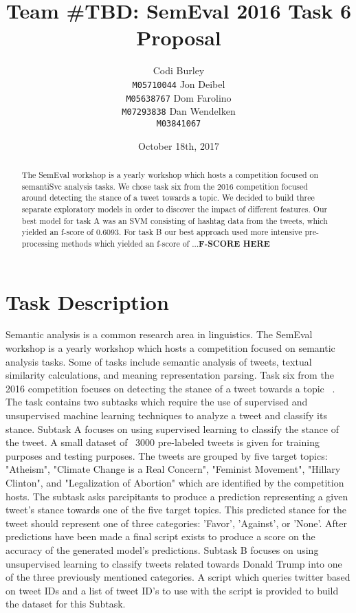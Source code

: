 \documentclass[11pt,letterpaper]{article}
\title{Team \#TBD: SemEval 2016 Task 6 Proposal}
\author{Codi Burley\\
    {\tt M05710044}
	  \And
	Jon Deibel\\
    {\tt M05638767}
    \And
    Dom Farolino\\
    {\tt M07293838}
    \And
    Dan Wendelken\\
    {\tt M03841067}}
\date{October 18th, 2017}
\begin{document}
\maketitle

\begin{abstract}
The SemEval workshop is a yearly workshop which hosts a competition focused on semantiSvc analysis tasks. We chose task six from the 2016 competition focused around detecting the stance of a tweet towards a topic. We decided to build three separate exploratory models in order to discover the impact of different features. Our best model for task A was an SVM consisting of hashtag data from the tweets, which yielded an f-score of 0.6093. For task B our best approach used more intensive pre-processing methods which yielded an f-score of ...{\bf F-SCORE HERE} \end{abstract}

\section{Task Description}

Semantic analysis is a common research area in linguistics.  The SemEval workshop is a yearly workshop which hosts a competition focused on semantic analysis tasks.  Some of tasks include semantic analysis of tweets, textual similarity calculations, and meaning representation parsing.  Task six from the 2016 competition focuses on detecting the stance of a tweet towards a topic ~\cite{task6}.  The task contains two subtasks which require the use of supervised and unsupervised machine learning techniques to analyze a tweet and classify its stance.  Subtask A focuses on using supervised learning to classify the stance of the tweet.  A small dataset of ~3000 pre-labeled tweets is given for training purposes and testing purposes.  The tweets are grouped by five target topics: "Atheism", "Climate Change is a Real Concern", "Feminist Movement", "Hillary Clinton", and "Legalization of Abortion" which are identified by the competition hosts.  The subtask asks parcipitants to produce a prediction representing a given tweet's stance towards one of the five target topics.  This predicted stance for the tweet should represent one of three categories: 'Favor', 'Against', or 'None'.  After predictions have been made a final script exists to produce a score on the accuracy of the generated model's predictions.  Subtask B focuses on using unsupervised learning to classify tweets related towards Donald Trump into one of the three previously mentioned categories.  A script which queries twitter based on tweet IDs and a list of tweet ID's to use with the script is provided to build the dataset for this Subtask.  
\end{document}

